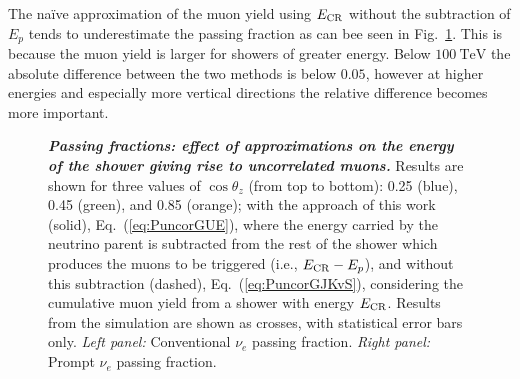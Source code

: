 The na\"ive approximation of the muon yield using $E_{\rm CR}$ without the subtraction of $E_p$ tends to underestimate the passing fraction as can bee seen in Fig.~\ref{fig:nue_passing-double-counting}.
This is because the muon yield is larger for showers of greater energy.
Below $\SI{100}\TeV$ the absolute difference between the two methods is below $0.05$, however at higher energies and especially more vertical directions the relative difference becomes more important.

\begin{figure}
	\centering
	\caption{\textbf{\textit{Passing fractions: effect of approximations on the energy of the shower giving rise to uncorrelated muons.}} Results are shown for three values of $\cos\theta_z$ (from top to bottom): 0.25 (blue), 0.45 (green), and 0.85 (orange); with the approach of this work (solid), Eq.~(\ref{eq:PuncorGUE}), where the energy carried by the neutrino parent is subtracted from the rest of the shower which produces the muons to be triggered (i.e., $E_{\rm CR} - E_p$), and without this subtraction (dashed), Eq.~(\ref{eq:PuncorGJKvS}), considering the cumulative muon yield from a shower with energy $E_{\rm CR}$. Results from the \CORSIKA{} simulation are shown as crosses, with statistical error bars only. \textit{Left panel:} Conventional $\nu_e$ passing fraction. \textit{Right panel:} Prompt $\nu_e$ passing fraction.
	}
	\label{fig:nue_passing-double-counting}
\end{figure}

